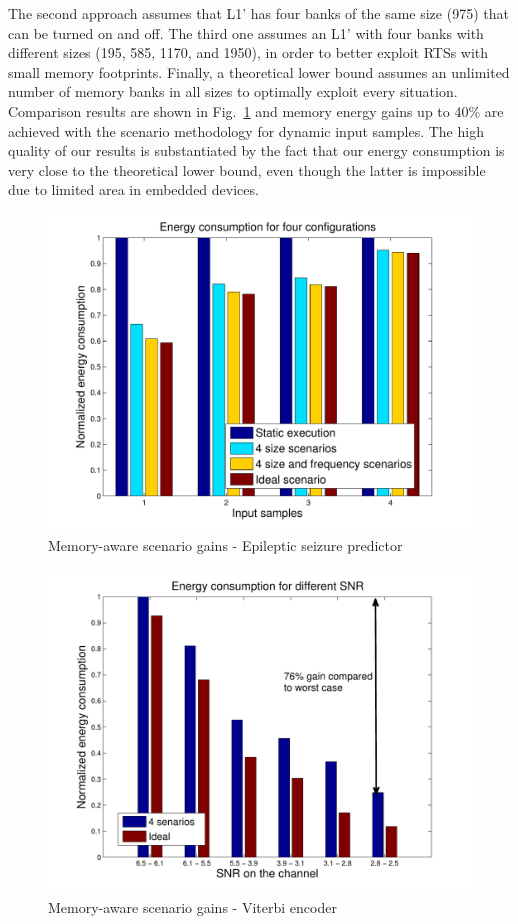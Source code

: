 The second approach assumes that L1' has four banks of the same size (975) that can be turned on and off. The third one assumes an L1' with four banks with different sizes (195, 585, 1170, and 1950), in order to better exploit RTSs with small memory footprints.  Finally, a theoretical lower bound assumes an unlimited number of memory banks in all sizes to optimally exploit every situation. Comparison results are shown in Fig.~\ref{fig:gainsEEG} and memory energy gains up to 40\% are achieved with the scenario methodology for dynamic input samples. The high quality of our results is substantiated by the fact that our energy consumption is very close to the theoretical lower bound, even though the latter is impossible due to limited area in embedded devices.  

\begin{figure}[!t]
\centering
\includegraphics[width=\textwidth]{A/results1-eps-converted-to.pdf}
\caption{Memory-aware scenario gains - Epileptic seizure predictor}
\label{fig:gainsEEG}
\end{figure}

\begin{figure}[!t]
\centering
\includegraphics[width=\textwidth]{A/res2-eps-converted-to.pdf}
\caption{Memory-aware scenario gains - Viterbi encoder}
\label{fig:gainsViterbi}
\end{figure}

